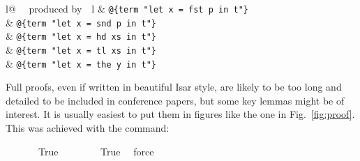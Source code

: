 \begin{isabellebody}
\begin{isamarkuptext}
  \begin{center}
  \begin{tabular}{l@ {~~produced by~~}l}
   & \verb!@!\verb!{term "let x = fst p in t"}!\\
   & \verb!@!\verb!{term "let x = snd p in t"}!\\
   & \verb!@!\verb!{term "let x = hd xs in t"}!\\
   & \verb!@!\verb!{term "let x = tl xs in t"}!\\
   & \verb!@!\verb!{term "let x = the y in t"}!\\
  \end{tabular}
  \end{center}%
\end{isamarkuptext}%
\isamarkuptrue%
%
\isamarkuptrue%
%
\begin{isamarkuptext}%
Full proofs, even if written in beautiful Isar style, are
likely to be too long and detailed to be included in conference
papers, but some key lemmas might be of interest.
It is usually easiest to put them in figures like the one in Fig.\
\ref{fig:proof}. This was achieved with the  command:%
\end{isamarkuptext}%
\isamarkuptrue%
%
\begin{figure}
  \begin{center}\begin{minipage}{0.6\textwidth}  
  \isastyleminor\isamarkuptrue
{}\isamarkupfalse%
\ True\isanewline
%
\isadelimproof
%
\endisadelimproof
%
\isatagproof
{}\isamarkupfalse%
\ {}\isanewline
\ \ %
\isanewline
\ \ \isamarkupfalse%
\ True\ \isamarkupfalse%
\ force\isanewline
{}\isamarkupfalse%
%
\endisatagproof
{\isafoldproof}%
%
\isadelimproof

\end{minipage}
\end{center}
\end{figure}
\end{isabellebody}

